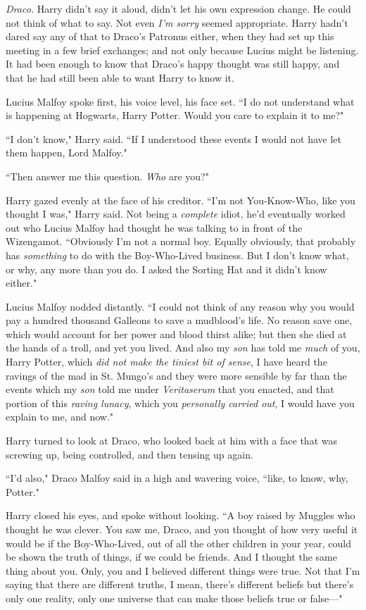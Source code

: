 \emph{Draco.} Harry didn't say it aloud, didn't let his own expression change. He could not think of what to say. Not even \emph{I'm sorry} seemed appropriate. Harry hadn't dared say any of that to Draco's Patronus either, when they had set up this meeting in a few brief exchanges; and not only because Lucius might be listening. It had been enough to know that Draco's happy thought was still happy, and that he had still been able to want Harry to know it.

Lucius Malfoy spoke first, his voice level, his face set. ``I do not understand what is happening at Hogwarts, Harry Potter. Would you care to explain it to me?"

``I don't know," Harry said. ``If I understood these events I would not have let them happen, Lord Malfoy."

``Then answer me this question. \emph{Who} are you?"

Harry gazed evenly at the face of his creditor. ``I'm not You-Know-Who, like you thought I was," Harry said. Not being a \emph{complete} idiot, he'd eventually worked out who Lucius Malfoy had thought he was talking to in front of the Wizengamot. ``Obviously I'm not a normal boy. Equally obviously, that probably has \emph{something} to do with the Boy-Who-Lived business. But I don't know what, or why, any more than you do. I asked the Sorting Hat and it didn't know either."

Lucius Malfoy nodded distantly. ``I could not think of any reason why you would pay a hundred thousand Galleons to save a mudblood's life. No reason save one, which would account for her power and blood thirst alike; but then she died at the hands of a troll, and yet you lived. And also my \emph{son} has told me \emph{much} of you, Harry Potter, which \emph{did not make the tiniest bit of sense}, I have heard the ravings of the mad in St. Mungo's and they were more sensible by far than the events which my \emph{son} told me under \emph{Veritaserum} that you enacted, and that portion of this \emph{raving lunacy}, which you \emph{personally carried out}, I would have you explain to me, and now."

Harry turned to look at Draco, who looked back at him with a face that was screwing up, being controlled, and then tensing up again.

``I'd also," Draco Malfoy said in a high and wavering voice, ``like, to know, why, Potter."

Harry closed his eyes, and spoke without looking. ``A boy raised by Muggles who thought he was clever. You saw me, Draco, and you thought of how very useful it would be if the Boy-Who-Lived, out of all the other children in your year, could be shown the truth of things, if we could be friends. And I thought the same thing about you. Only, you and I believed different things were true. Not that I'm saying that there are different truths, I mean, there's different beliefs but there's only one reality, only one universe that can make those beliefs true or false—"

